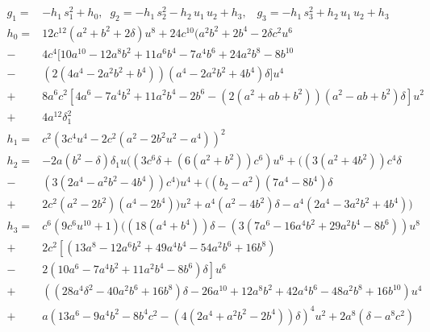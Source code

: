  {\small  
	\begin{align*}
		g_1=&    -h_1 \, s_1^2 
		+h_0,\;\;g_2=- h_1\, s_2^2 -
		h_2 \,u_1 \,u_2 +h_3,\;\;\;g_3=- h_1 \,s_3^2 + h_2\,  u_1\, u_2+h_3\\
		h_0=& 12c^{12}(a^2+b^2+2\delta)u^8+24c^{10}(a^2b^2+2b^4-2\delta c^2 u^6\\
		-&4c^4[10a^{10}-12a^8b^2+11a^6b^4-7a^4b^6+24a^2b^8-8b^{10}\\
		-&  (2(4a^4-2a^2b^2+b^4))(a^4-2a^2b^2+4b^4)
		\delta
		]u^4\\
		+&8a^6 c^2[4a^6-7a^4b^2+11a^2b^4-2b^6-(2(a^2+ab+b^2))(a^2-ab+b^2)\delta]u^2\\
		+&4a^{12} \delta_1^2	\\
		h_1=&  c^2\left(3c^4 u^4-2c^2(a^2-2b^2 u^2-a^4)\right)^2\\
		h_2=&-2{a(b^2-\delta)}\delta_1 u ((3 c^6 \delta+(6 (a^2+b^2)) c^6) u^6+((3 (a^2+4 b^2)) c^4 \delta \\
		-& (3 (2 a^4-a^2 b^2-4 b^4)) c^4) u^4
		+( (b_2-a^2 ) (7 a^4-8 b^4) \delta\\
		+& 2 c^2  (a^2-2 b^2) (a^4-2 b^4)) u^2+a^4 (a^2-4 b^2) \delta-a^4 (2 a^4-3 a^2 b^2+4 b^4))\\
		h_3=&c^6 (9 c^{6} u^{10}+ 1)((18 (a^4+b^4))  \delta-(3 (7 a^6-16 a^4 b^2+29 a^2 b^4-8 b^6)) u^8\\
		+&2c^2\left[     (13 a^8-12 a^6 b^2+49 a^4 b^4-54 a^2 b^6+16 b^8)\right.\\
		-& \left. 2   (10 a^6-7 a^4 b^2+11 a^2 b^4-8 b^6) \delta 
		\right] u^6\\
		+&((28a^4\delta^2-40 a^2 b^6+16 b^8) \delta 
		-  26 a^{10}+12 a^8 b^2+42 a^4 b^6-48 a^2 b^8+16 b^{10}) u^4\\
		+&a(13 a^6-9 a^4 b^2-8 b^4c^2 -(4 (2 a^4+a^2 b^2-2 b^4)) \delta)^4 u^2+2 a^8 ( \delta-a^8
		 c^2)
	\end{align*}
	}%
	





